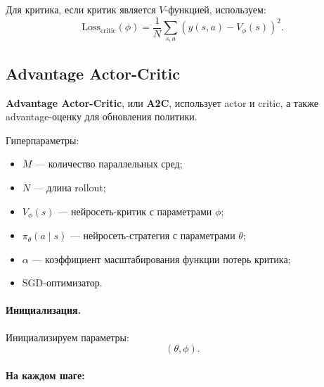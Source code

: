 \documentclass[12pt,a4paper]{article}
\begin{document}
Для критика, если критик является $V$-функцией, используем:
\[
\mathrm{Loss}_{\mathrm{critic}}(\phi)
=
\frac{1}{N}
\sum_{s,a}
\left(
y(s,a)
-
V_\phi(s)
\right)^2.
\]

\subsection{Advantage Actor-Critic}

\textbf{Advantage Actor-Critic}, или \textbf{A2C}, использует actor и critic, а также advantage-оценку для обновления политики.

Гиперпараметры:
\begin{itemize}
    \item $M$ --- количество параллельных сред;
    \item $N$ --- длина rollout;
    \item $V_\phi(s)$ --- нейросеть-критик с параметрами $\phi$;
    \item $\pi_\theta(a\mid s)$ --- нейросеть-стратегия с параметрами $\theta$;
    \item $\alpha$ --- коэффициент масштабирования функции потерь критика;
    \item SGD-оптимизатор.
\end{itemize}

\paragraph{Инициализация.}

Инициализируем параметры:
\[
(\theta,\phi).
\]

\paragraph{На каждом шаге:}
\end{document}
